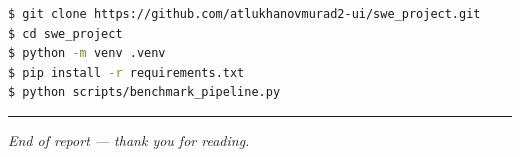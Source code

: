 \documentclass[11pt,a4paper]{article}
\begin{document}
\begin{lstlisting}[style=python,language=bash,numbers=none]
$ git clone https://github.com/atlukhanovmurad2-ui/swe_project.git
$ cd swe_project
$ python -m venv .venv
$ pip install -r requirements.txt
$ python scripts/benchmark_pipeline.py
\end{lstlisting}

\vspace{1em}\hrule\vspace{0.6em}
\noindent\small\textit{End of report --- thank you for reading.}
\end{document}
